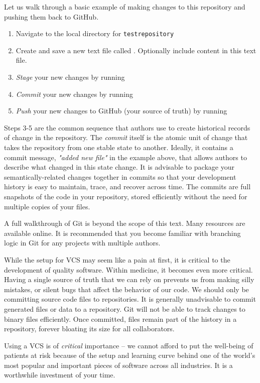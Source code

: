 Let us walk through a basic example of making changes to this repository and pushing them back to GitHub.

\begin{enumerate}
    \item Navigate to the local directory for \texttt{test\textunderscore repository}
    \item Create and save a new text file called . Optionally include content in this text file.
    \item \textit{Stage} your new changes by running 
    \item \textit{Commit} your new changes by running 
    \item \textit{Push} your new changes to GitHub (your source of truth) by running 
\end{enumerate}

Steps 3-5 are the common sequence that authors use to create historical records of change in the repository. The \textit{commit} itself is the atomic unit of change that takes the repository from one stable state to another. Ideally, it contains a commit message, \textit{"added new file"} in the example above, that allows authors to describe what changed in this state change.
It is advisable to package your semantically-related changes together in commits so that your development history is easy to maintain, trace, and recover across time. The commits are full snapshots of the code in your repository, stored efficiently without the need for multiple copies of your files.

A full walkthrough of Git is beyond the scope of this text. Many resources are available online. It is recommended that you become familiar with branching logic in Git for any projects with multiple authors.

While the setup for VCS may seem like a pain at first, it is critical to the development of quality software.
Within medicine, it becomes even more critical. Having a single source of truth that we can rely on prevents us from making silly mistakes, or silent bugs that affect the behavior of our code. We should only be committing source code files to repositories. It is generally unadvisable to commit generated files or data to a repository. Git will not be able to track changes to binary files efficiently. Once committed, files remain part of the history in a repository, forever bloating its size for all collaborators.

Using a VCS is of \textit{critical} importance -- we cannot afford to put the well-being of patients at risk because of the setup and learning curve behind one of the world's most popular and important pieces of software across all industries. It is a worthwhile investment of your time.
